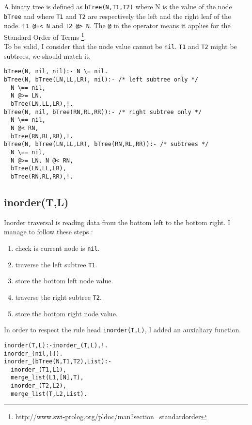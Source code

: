 \documentclass{article}
\begin{document}
    A binary tree is defined as \texttt{bTree(N,T1,T2)} where N is
    the value of the node \texttt{bTree} and where
    \texttt{T1} and  \texttt{T2} are respectively the
    left and the right leaf of the node. \texttt{T1 @=< N} and
    \texttt{T2 @> N}. The \texttt{@} in the operator
    means it applies for the Standard Order of Terms
    \footnote{http://www.swi-prolog.org/pldoc/man?section=standardorder}.\\
    To be valid, I consider that the node value cannot be \texttt{nil}.
    \texttt{T1} and  \texttt{T2} might be subtrees, we
    should match it.

    \begin{verbatim}
bTree(N, nil, nil):- N \= nil.
bTree(N, bTree(LN,LL,LR), nil):- /* left subtree only */
  N \== nil,
  N @>= LN,
  bTree(LN,LL,LR),!.
bTree(N, nil, bTree(RN,RL,RR)):- /* right subtree only */
  N \== nil,
  N @< RN,
  bTree(RN,RL,RR),!.
bTree(N, bTree(LN,LL,LR), bTree(RN,RL,RR)):- /* subtrees */
  N \== nil,
  N @>= LN, N @< RN,
  bTree(LN,LL,LR),
  bTree(RN,RL,RR),!.
    \end{verbatim}

  \subsection*{inorder(T,L)}

    Inorder traversal is reading data from the bottom left to the bottom right.
    I manage to follow these steps :

    \begin{enumerate}
      \item check is current node is \texttt{nil}.
      \item traverse the left subtree \texttt{T1}.
      \item store the bottom left node value.
      \item traverse the right subtree \texttt{T2}.
      \item store the bottom right node value.
    \end{enumerate}

    In order to respect the rule head \texttt{inorder(T,L)}, I added
    an auxialiary function.

    \begin{verbatim}
inorder(T,L):-inorder_(T,L),!.
inorder_(nil,[]).
inorder_(bTree(N,T1,T2),List):-
  inorder_(T1,L1),
  merge_list(L1,[N],T),
  inorder_(T2,L2),
  merge_list(T,L2,List).
    \end{verbatim}
\end{document}
